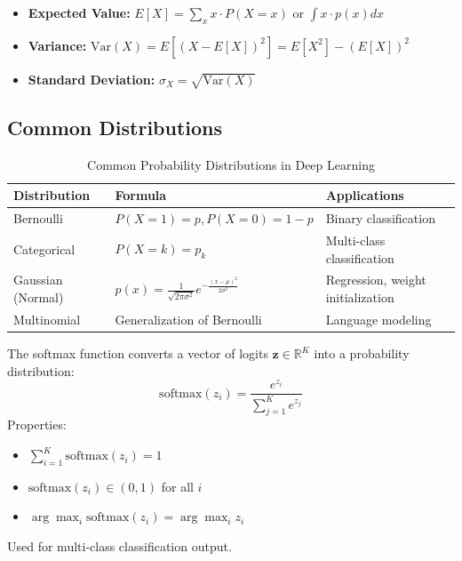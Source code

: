 \begin{itemize}
    \item \textbf{Expected Value:} $E[X] = \sum_x x \cdot P(X=x)$ or $\int x \cdot p(x) dx$
    \item \textbf{Variance:} $\text{Var}(X) = E[(X - E[X])^2] = E[X^2] - (E[X])^2$
    \item \textbf{Standard Deviation:} $\sigma_X = \sqrt{\text{Var}(X)}$
\end{itemize}

\subsection{Common Distributions}

\begin{table}[h]
    \centering
    \caption{Common Probability Distributions in Deep Learning}
    \begin{tabular}{L{3cm} L{4cm} L{5cm}}
        \toprule
        \textbf{Distribution} & \textbf{Formula} & \textbf{Applications} \\
        \midrule
        Bernoulli & $P(X=1) = p, P(X=0) = 1-p$ & Binary classification \\
        Categorical & $P(X=k) = p_k$ & Multi-class classification \\
        Gaussian (Normal) & $p(x) = \frac{1}{\sqrt{2\pi\sigma^2}}e^{-\frac{(x-\mu)^2}{2\sigma^2}}$ & Regression, weight initialization \\
        Multinomial & Generalization of Bernoulli & Language modeling \\
        \bottomrule
    \end{tabular}
\end{table}

\begin{example}
The softmax function converts a vector of logits $\mathbf{z} \in \mathbb{R}^K$ into a probability distribution:
\begin{equation}
\text{softmax}(z_i) = \frac{e^{z_i}}{\sum_{j=1}^{K} e^{z_j}}
\end{equation}
Properties:
\begin{itemize}
    \item $\sum_{i=1}^{K} \text{softmax}(z_i) = 1$
    \item $\text{softmax}(z_i) \in (0, 1)$ for all $i$
    \item $\arg\max_i \text{softmax}(z_i) = \arg\max_i z_i$
\end{itemize}
Used for multi-class classification output.
\end{example}

